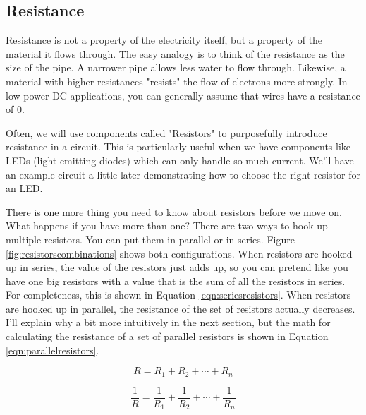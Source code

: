 \subsection{Resistance}

Resistance is not a property of the electricity itself, but a property of the material it flows through. The easy analogy is to think of the resistance as the size of the pipe. A narrower pipe allows less water to flow through. Likewise, a material with higher resistances "resists" the flow of electrons more strongly. In low power DC applications, you can generally assume that wires have a resistance of 0.

Often, we will use components called "Resistors" to purposefully introduce resistance in a circuit. This is particularly useful when we have components like LEDs (light-emitting diodes) which can only handle so much current. We'll have an example circuit a little later demonstrating how to choose the right resistor for an LED.

There is one more thing you need to know about resistors before we move on. What happens if you have more than one? There are two ways to hook up multiple resistors. You can put them in parallel or in series. Figure \ref{fig:resistorscombinations} shows both configurations. When resistors are hooked up in series, the value of the resistors just adds up, so you can pretend like you have one big resistors with a value that is the sum of all the resistors in series. For completeness, this is shown in Equation \ref{eqn:seriesresistors}. When resistors are hooked up in parallel, the resistance of the set of resistors actually decreases. I'll explain why a bit more intuitively in the next section, but the math for calculating the resistance of a set of parallel resistors is shown in Equation \ref{eqn:parallelresistors}.

\begin{equation}
R = R_1 + R_2 + \cdots + R_n
\label{eqn:seriesresistors}
\end{equation}

\begin{equation}
\frac{1}{R} = \frac{1}{R_1} + \frac{1}{R_2} + \cdots + \frac{1}{R_n}
\label{eqn:parallelresistors}
\end{equation}

